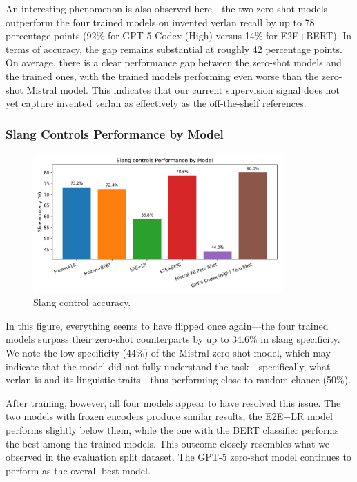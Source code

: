 \documentclass[12pt]{article}
\begin{document}
An interesting phenomenon is also observed here\;---\;the two zero-shot models outperform the four trained models on invented verlan recall by up to 78 percentage points (92\% for GPT-5 Codex (High) versus 14\% for E2E+BERT). 
In terms of accuracy, the gap remains substantial at roughly 42 percentage points.
On average, there is a clear performance gap between the zero-shot models and the trained ones, with the trained models performing even worse than the zero-shot Mistral model. This indicates that our current supervision signal does not yet capture invented verlan as effectively as the off-the-shelf references.

\subsubsection{Slang Controls Performance by Model}

\begin{figure}[htbp]
    \centering
    \includegraphics[width=0.85\textwidth]{figures/slang_controls_comparison.png}
    \caption{Slang control accuracy.}
    \label{fig:slang-comparison}
\end{figure}

In this figure, everything seems to have flipped once again\;---\;the four trained models surpass their zero-shot counterparts by up to 34.6\% in slang specificity. 
We note the low specificity (44\%) of the Mistral zero-shot model, which may indicate that the model did not fully understand the task\;---\;specifically, what verlan is and its linguistic traits\;---\;thus performing close to random chance (50\%).

After training, however, all four models appear to have resolved this issue. 
The two models with frozen encoders produce similar results, the E2E+LR model performs slightly below them, while the one with the BERT classifier performs the best among the trained models. 
This outcome closely resembles what we observed in the evaluation split dataset. 
The GPT-5 zero-shot model continues to perform as the overall best model.
\end{document}
